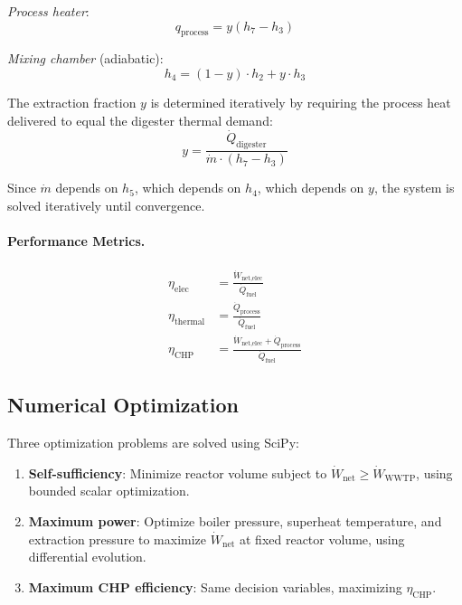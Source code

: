 \documentclass[12pt, letterpaper]{article}
\begin{document}
\textit{Process heater}:
\begin{equation}
  q_\text{process} = y(h_7 - h_3)
  \label{eq:q_process}
\end{equation}

\textit{Mixing chamber} (adiabatic):
\begin{equation}
  h_4 = (1-y) \cdot h_2 + y \cdot h_3
  \label{eq:mixing}
\end{equation}

The extraction fraction $y$ is determined iteratively by requiring the process heat delivered to equal the digester thermal demand:
\begin{equation}
  y = \frac{\dot{Q}_\text{digester}}{\dot{m} \cdot (h_7 - h_3)}
  \label{eq:y}
\end{equation}

Since $\dot{m}$ depends on $h_5$, which depends on $h_4$, which depends on $y$, the system is solved iteratively until convergence.

\paragraph{Performance Metrics.}
\begin{align}
  \eta_\text{elec} &= \frac{\dot{W}_\text{net,elec}}{\dot{Q}_\text{fuel}} \label{eq:eta_elec} \\
  \eta_\text{thermal} &= \frac{\dot{Q}_\text{process}}{\dot{Q}_\text{fuel}} \label{eq:eta_thermal} \\
  \eta_\text{CHP} &= \frac{\dot{W}_\text{net,elec} + \dot{Q}_\text{process}}{\dot{Q}_\text{fuel}} \label{eq:eta_chp}
\end{align}

\subsection{Numerical Optimization}

Three optimization problems are solved using SciPy:
\begin{enumerate}[noitemsep]
  \item \textbf{Self-sufficiency}: Minimize reactor volume subject to $\dot{W}_\text{net} \geq \dot{W}_\text{WWTP}$, using bounded scalar optimization.
  \item \textbf{Maximum power}: Optimize boiler pressure, superheat temperature, and extraction pressure to maximize $\dot{W}_\text{net}$ at fixed reactor volume, using differential evolution.
  \item \textbf{Maximum CHP efficiency}: Same decision variables, maximizing $\eta_\text{CHP}$.
\end{enumerate}
\end{document}

